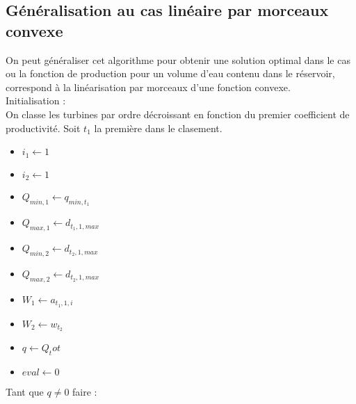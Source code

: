 \documentclass[a4paper]{report}
\begin{document}
\subsection{Généralisation au cas linéaire par morceaux convexe}
On peut généraliser cet algorithme pour obtenir une solution optimal dans le cas ou la fonction de production pour un volume d'eau contenu dans le réservoir, correspond à la linéarisation par morceaux d'une fonction convexe.\\
Initialisation :\\
On classe les turbines par ordre décroissant en fonction du premier coefficient de productivité. Soit $t_1$  la première dans le clasement.\\
\begin{itemize}

\item $i_1\longleftarrow 1$
\item $i_2\longleftarrow 1$
\item $Q_{min,1}\leftarrow  q_{min,t_1}$
\item $Q_{max,1} \leftarrow d_{t_1,1,max}$
\item $Q_{min,2}\leftarrow d_{t_2,1,max}$
\item $Q_{max,2} \leftarrow d_{t_2,1,max}$
\item $W_1 \leftarrow a_{t_1,1,i}$
\item $W_2 \leftarrow w_{t_2}$
\item $q\leftarrow Q_tot$
\item $eval\leftarrow 0$
 \end{itemize}
Tant que $q \neq 0$ faire :\\
\end{document}
